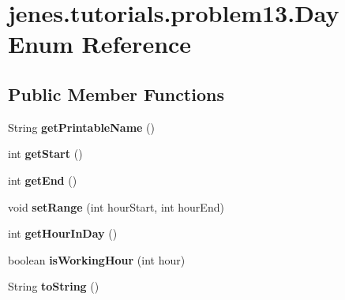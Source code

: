 \hypertarget{enumjenes_1_1tutorials_1_1problem13_1_1_day}{\section{jenes.\-tutorials.\-problem13.\-Day Enum Reference}
\label{enumjenes_1_1tutorials_1_1problem13_1_1_day}
}
\subsection*{Public Member Functions}
\begin{DoxyCompactItemize}
\item 
\hypertarget{enumjenes_1_1tutorials_1_1problem13_1_1_day_a0faa8e96b679c5e37225f4f59051c8e1}{String {\bfseries get\-Printable\-Name} ()}\label{enumjenes_1_1tutorials_1_1problem13_1_1_day_a0faa8e96b679c5e37225f4f59051c8e1}

\item 
\hypertarget{enumjenes_1_1tutorials_1_1problem13_1_1_day_ae04d7c27be3e5e86979515c855016110}{int {\bfseries get\-Start} ()}\label{enumjenes_1_1tutorials_1_1problem13_1_1_day_ae04d7c27be3e5e86979515c855016110}

\item 
\hypertarget{enumjenes_1_1tutorials_1_1problem13_1_1_day_ac3cc261a3407313eba8618ab33d4ae54}{int {\bfseries get\-End} ()}\label{enumjenes_1_1tutorials_1_1problem13_1_1_day_ac3cc261a3407313eba8618ab33d4ae54}

\item 
\hypertarget{enumjenes_1_1tutorials_1_1problem13_1_1_day_a7f99a54ba8e82dc1823217c653bec974}{void {\bfseries set\-Range} (int hour\-Start, int hour\-End)}\label{enumjenes_1_1tutorials_1_1problem13_1_1_day_a7f99a54ba8e82dc1823217c653bec974}

\item 
\hypertarget{enumjenes_1_1tutorials_1_1problem13_1_1_day_a36ecba519d7a49d4a8c857eab711e6a7}{int {\bfseries get\-Hour\-In\-Day} ()}\label{enumjenes_1_1tutorials_1_1problem13_1_1_day_a36ecba519d7a49d4a8c857eab711e6a7}

\item 
\hypertarget{enumjenes_1_1tutorials_1_1problem13_1_1_day_a1a5929a9c5f2e597ff0bea1a1b8c8d35}{boolean {\bfseries is\-Working\-Hour} (int hour)}\label{enumjenes_1_1tutorials_1_1problem13_1_1_day_a1a5929a9c5f2e597ff0bea1a1b8c8d35}

\item 
\hypertarget{enumjenes_1_1tutorials_1_1problem13_1_1_day_abe3ee71f9c6f34242e3375e7a627fe9f}{String {\bfseries to\-String} ()}\label{enumjenes_1_1tutorials_1_1problem13_1_1_day_abe3ee71f9c6f34242e3375e7a627fe9f}

\end{DoxyCompactItemize}
